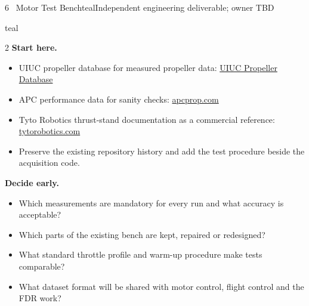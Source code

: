 \documentclass[10pt,a4paper]{article}
\begin{document}
\begin{project}{6 \, Motor Test Bench}{teal}{Independent engineering deliverable; owner TBD}
\begin{research}{teal}
\smallskip
\begin{multicols}{2}\RaggedRight
\textbf{Start here.}
\begin{itemize}
  \item UIUC propeller database for measured propeller data: \href{https://m-selig.ae.illinois.edu/props/propDB.html}{UIUC Propeller Database}
  \item APC performance data for sanity checks: \href{https://www.apcprop.com/technical-information/performance-data/}{apcprop.com}
  \item Tyto Robotics thrust-stand documentation as a commercial reference: \href{https://www.tytorobotics.com}{tytorobotics.com}
  \item Preserve the existing repository history and add the test procedure beside the acquisition code.
\end{itemize}
\columnbreak
\textbf{Decide early.}
\begin{itemize}
  \item Which measurements are mandatory for every run and what accuracy is acceptable?
  \item Which parts of the existing bench are kept, repaired or redesigned?
  \item What standard throttle profile and warm-up procedure make tests comparable?
  \item What dataset format will be shared with motor control, flight control and the FDR work?
\end{itemize}
\end{multicols}
\end{research}
\end{project}
\end{document}

